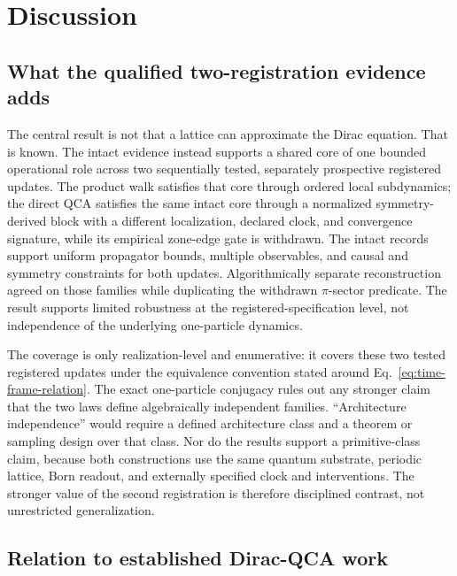 \section{Discussion}
\label{sec:discussion}

\subsection{What the qualified two-registration evidence adds}

The central result is not that a lattice can approximate the Dirac equation.
That is known.  The intact evidence instead supports a shared core of one
bounded operational role across two sequentially tested, separately
prospective registered updates.  The product walk satisfies that core through
ordered local subdynamics; the direct QCA satisfies the same intact core
through a normalized symmetry-derived block with a different localization,
declared clock, and convergence signature, while its empirical zone-edge gate
is withdrawn.  The intact records support uniform propagator bounds, multiple
observables, and causal and symmetry constraints for both updates.
Algorithmically separate reconstruction agreed on those families while
duplicating the withdrawn $\pi$-sector predicate.  The result supports limited
robustness at the registered-specification level, not independence of the
underlying one-particle dynamics.

The coverage is only realization-level and enumerative: it covers these
two tested registered updates under the equivalence convention stated around
Eq.~\eqref{eq:time-frame-relation}.  The exact one-particle conjugacy rules out
any stronger claim that the two laws define algebraically independent
families.  ``Architecture independence'' would require a defined
architecture class and a theorem or sampling design over that class.  Nor do
the results support a primitive-class claim, because both constructions use
the same quantum substrate, periodic lattice, Born readout, and externally
specified clock and interventions.  The stronger value of the second
registration is therefore disciplined contrast, not unrestricted
generalization.

\subsection{Relation to established Dirac-QCA work}

